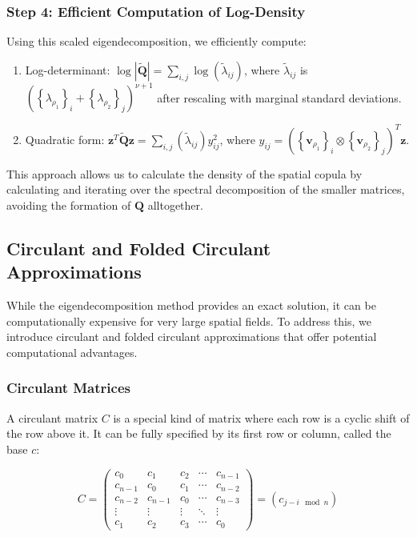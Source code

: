 \documentclass[
  letterpaper,
  DIV=11,
  numbers=noendperiod]{scrartcl}
\begin{document}
\subsubsection{Step 4: Efficient Computation of
Log-Density}\label{step-4-efficient-computation-of-log-density}

Using this scaled eigendecomposition, we efficiently compute:

\begin{enumerate}
\def\labelenumi{\arabic{enumi}.}
\item
  Log-determinant:
  \(\log|\mathbf{\widetilde Q}| = \sum_{i,j} \log(\widetilde\lambda_{ij})\),
  where \(\widetilde\lambda_{ij}\) is
  \(\left( \left\{\lambda_{\rho_1}\right\}_i + \left\{\lambda_{\rho_2}\right\}_j \right)^{\nu+1}\)
  after rescaling with marginal standard deviations.
\item
  Quadratic form:
  \(\mathbf{z}^T\mathbf{\widetilde Q}\mathbf{z} = \sum_{i,j} (\widetilde\lambda_{ij}) y_{ij}^2\),
  where
  \(y_{ij} = \left(\left\{\mathbf{v}_{\rho_1}\right\}_i \otimes \left\{\mathbf{v}_{\rho_2}\right\}_j\right)^T\mathbf{z}\).
\end{enumerate}

This approach allows us to calculate the density of the spatial copula
by calculating and iterating over the spectral decomposition of the
smaller matrices, avoiding the formation of \(\mathbf Q\) alltogether.

\subsection{Circulant and Folded Circulant
Approximations}\label{circulant-and-folded-circulant-approximations}

While the eigendecomposition method provides an exact solution, it can
be computationally expensive for very large spatial fields. To address
this, we introduce circulant and folded circulant approximations that
offer potential computational advantages.

\subsubsection{Circulant Matrices}\label{circulant-matrices}

A circulant matrix \(C\) is a special kind of matrix where each row is a
cyclic shift of the row above it. It can be fully specified by its first
row or column, called the base \(c\):

\[
C = \begin{pmatrix}
c_0 & c_1 & c_2 & \cdots & c_{n-1} \\
c_{n-1} & c_0 & c_1 & \cdots & c_{n-2} \\
c_{n-2} & c_{n-1} & c_0 & \cdots & c_{n-3} \\
\vdots & \vdots & \vdots & \ddots & \vdots \\
c_1 & c_2 & c_3 & \cdots & c_0
\end{pmatrix} = (c_{j-i \mod n})
\]
\end{document}
